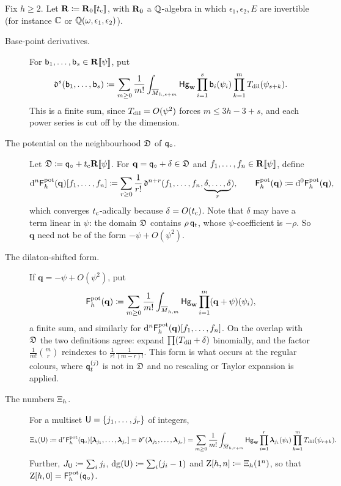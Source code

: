 Fix $h\geq2$. Let $\mathbf{R}\coloneqq\mathbf{R}_0[\![ t_{\mathrm{c}} ]\!]$, with $\mathbf{R}_0$ a $\mathbb{Q}$-algebra in which $\epsilon_1,\epsilon_2,E$ are invertible (for instance $\mathbb{C}$ or $\mathbb{Q}(\omega,\epsilon_1,\epsilon_2)$).

\begin{defn}
\label{def:set-fpot}
\begin{description}
\item[Base-point derivatives.] For $\mathsf{b}_1,\ldots,\mathsf{b}_s\in\mathbf{R}[\![ \psi ]\!]$, put
\[
\mathfrak{d}^s(\mathsf{b}_1,\ldots,\mathsf{b}_s)\coloneqq\sum_{m\geq 0}\frac{1}{m!}\int_{\overline{M}_{h,s+m}}\mathsf{Hg}_{\mathbf{w}}\prod_{i=1}^s\mathsf{b}_i(\psi_i)\prod_{k=1}^{m}T_{\mathrm{dil}}(\psi_{s+k}).
\]
This is a finite sum, since $T_{\mathrm{dil}}=O(\psi^2)$ forces $m\leq3h-3+s$, and each power series is cut off by the dimension.
\item[The potential on the neighbourhood $\mathfrak{D}$ of $\mathsf{q}_{\circ}$.] Let $\mathfrak{D}\coloneqq\mathsf{q}_{\circ}+t_{\mathrm{c}}\mathbf{R}[\![ \psi ]\!]$. For $\mathbf{q}=\mathsf{q}_{\circ}+\delta\in\mathfrak{D}$ and $f_1,\ldots,f_n\in\mathbf{R}[\![ \psi ]\!]$, define
\[
\mathrm{d}^n\mathsf{F}^{\mathrm{pot}}_h(\mathbf{q})[f_1,\ldots,f_n]\coloneqq\sum_{r\geq0}\frac{1}{r!}\,\mathfrak{d}^{n+r}(f_1,\ldots,f_n,\underbrace{\delta,\ldots,\delta}_{r}),\qquad\mathsf{F}^{\mathrm{pot}}_h(\mathbf{q})\coloneqq\mathrm{d}^0\mathsf{F}^{\mathrm{pot}}_h(\mathbf{q}),
\]
which converges $t_{\mathrm{c}}$-adically because $\delta=O(t_{\mathrm{c}})$. Note that $\delta$ may have a term linear in $\psi$: the domain $\mathfrak{D}$ contains $\rho\,\mathsf{q}_{t}$, whose $\psi$-coefficient is $-\rho$. So $\mathbf{q}$ need not be of the form $-\psi+O(\psi^2)$.
\item[The dilaton-shifted form.] If $\mathbf{q}=-\psi+O(\psi^2)$, put
\[
\mathsf{F}^{\mathrm{pot}}_h(\mathbf{q})\coloneqq\sum_{m\geq 0}\frac{1}{m!}\int_{\overline{M}_{h,m}}\mathsf{Hg}_{\mathbf{w}}\prod_{i=1}^m(\mathbf{q}+\psi)(\psi_i),
\]
a finite sum, and similarly for $\mathrm{d}^n\mathsf{F}^{\mathrm{pot}}_h(\mathbf{q})[f_1,\ldots,f_n]$. On the overlap with $\mathfrak{D}$ the two definitions agree: expand $\prod(T_{\mathrm{dil}}+\delta)$ binomially, and the factor $\frac{1}{m!}\binom mr$ reindexes to $\frac{1}{r!}\frac{1}{(m-r)!}$. This form is what occurs at the regular colours, where $\mathsf{q}_{t}^{(j)}$ is not in $\mathfrak{D}$ and no rescaling or Taylor expansion is applied.
\item[The numbers $\Xi_h$.] For a multiset $\mathsf{U}=\{j_1,\ldots,j_r\}$ of integers,
\[
\Xi_h(\mathsf{U})\coloneqq\mathrm{d}^r\mathsf{F}^{\mathrm{pot}}_h(\mathsf{q}_{\circ})[\boldsymbol{\lambda}_{j_1},\ldots,\boldsymbol{\lambda}_{j_r}]=\mathfrak{d}^r(\boldsymbol{\lambda}_{j_1},\ldots,\boldsymbol{\lambda}_{j_r})=\sum_{m\geq 0}\frac{1}{m!}\int_{\overline{M}_{h,r+m}}\mathsf{Hg}_{\mathbf{w}}\prod_{i=1}^{r}\boldsymbol{\lambda}_{j_i}(\psi_i)\prod_{k=1}^{m}T_{\mathrm{dil}}(\psi_{r+k}).
\]
Further, $J_{\mathsf{U}}\coloneqq\sum_ij_i$, $\mathrm{dg}(\mathsf{U})\coloneqq\sum_i(j_i-1)$ and $\mathrm{Z}[h,n]\coloneqq\Xi_h(1^n)$, so that $\mathrm{Z}[h,0]=\mathsf{F}^{\mathrm{pot}}_h(\mathsf{q}_{\circ})$.
\end{description}
\end{defn}

